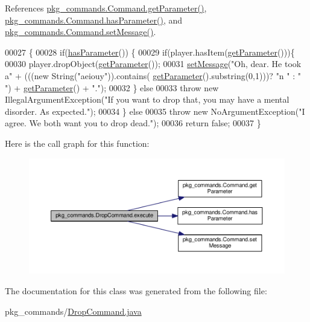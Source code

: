 References \hyperlink{Command_8java_source_l00034}{pkg\-\_\-commands.\-Command.\-get\-Parameter()}, \hyperlink{Command_8java_source_l00050}{pkg\-\_\-commands.\-Command.\-has\-Parameter()}, and \hyperlink{Command_8java_source_l00058}{pkg\-\_\-commands.\-Command.\-set\-Message()}.


\begin{DoxyCode}
00027                                                                                               \{
00028         \textcolor{keywordflow}{if}(\hyperlink{classpkg__commands_1_1Command_a02af95ab3f1898a66259ab7c177b6998}{hasParameter}()) \{
00029             \textcolor{keywordflow}{if}(player.hasItem(\hyperlink{classpkg__commands_1_1Command_a41c92d445be73ea9d62320c65efb8434}{getParameter}()))\{
00030                 player.dropObject(\hyperlink{classpkg__commands_1_1Command_a41c92d445be73ea9d62320c65efb8434}{getParameter}());
00031                 \hyperlink{classpkg__commands_1_1Command_ae210ff216fe908b111ba1c988a963d13}{setMessage}(\textcolor{stringliteral}{"Oh, dear. He took a"} + (((\textcolor{keyword}{new} String(\textcolor{stringliteral}{"aeiouy"})).contains(
      \hyperlink{classpkg__commands_1_1Command_a41c92d445be73ea9d62320c65efb8434}{getParameter}().substring(0,1)))? \textcolor{stringliteral}{"n "} : \textcolor{stringliteral}{" "}) + \hyperlink{classpkg__commands_1_1Command_a41c92d445be73ea9d62320c65efb8434}{getParameter}() + \textcolor{stringliteral}{"."});
00032             \} \textcolor{keywordflow}{else}
00033                 \textcolor{keywordflow}{throw} \textcolor{keyword}{new} IllegalArgumentException(\textcolor{stringliteral}{"If you want to drop that, you may have a mental
       disorder. As expected."});
00034         \} \textcolor{keywordflow}{else}
00035             \textcolor{keywordflow}{throw} \textcolor{keyword}{new} NoArgumentException(\textcolor{stringliteral}{"I agree. We both want you to drop dead."});
00036         \textcolor{keywordflow}{return} \textcolor{keyword}{false};
00037     \}
\end{DoxyCode}


Here is the call graph for this function\-:
\nopagebreak
\begin{figure}[H]
\begin{center}
\leavevmode
\includegraphics[width=350pt]{classpkg__commands_1_1DropCommand_a742e37b2d2dd4e111130811ee2f4dd0b_cgraph}
\end{center}
\end{figure}




The documentation for this class was generated from the following file\-:\begin{DoxyCompactItemize}
\item 
pkg\-\_\-commands/\hyperlink{DropCommand_8java}{Drop\-Command.\-java}\end{DoxyCompactItemize}
